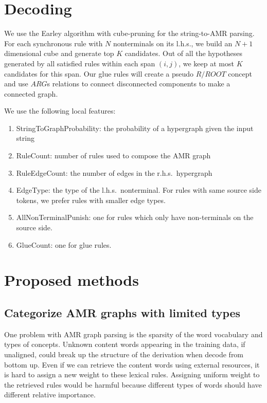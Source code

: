 \section{Decoding}
We use the Earley algorithm with cube-pruning \cite{ChiangCL} for the string-to-AMR parsing. 
For each synchronous rule with $N$ nonterminals on its l.h.s., we build an $N+1$ dimensional cube and generate top $K$ candidates. 
Out of all the hypotheses generated by all satisfied rules within each span $(i,j)$, we keep at most $K$ candidates for this span.
Our glue rules will create a pseudo $R/ROOT$ concept and use $ARG$s relations to connect
disconnected components to make a connected graph.


We use the following local features:
\begin{enumerate}
    \item StringToGraphProbability: the probability of a hypergraph given the input string
    \item RuleCount: number of rules used to compose the AMR graph
    \item RuleEdgeCount: the number of edges in the r.h.s.\ hypergraph 
    \item EdgeType: the type of the l.h.s.\ nonterminal. For rules with same source side tokens, we prefer rules with smaller edge types.
    \item AllNonTerminalPunish: one for rules which only have non-terminals on the source side.
    \item GlueCount: one for glue rules.  
\end{enumerate}

\section{Proposed methods}
\subsection{Categorize AMR graphs with limited types}
One problem with AMR graph parsing is the sparsity of the word vocabulary and types of concepts. Unknown content words appearing in the training data, if unaligned, could
break up the structure of the derivation when decode from bottom up. Even if we can retrieve the content words using external resources, it is hard to assign a new weight to these lexical rules.
Assigning uniform weight to the retrieved rules would be harmful because different types of words should have different relative importance.


